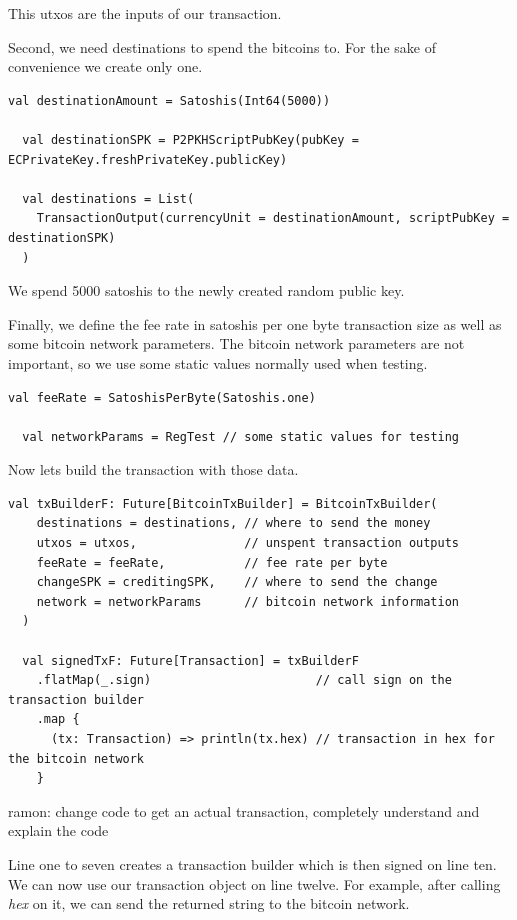 \documentclass[runningheads]{llncs}
\newcommand{\todo}[1]{{\par \color{red}#1}}
\begin{document}
This utxos are the inputs of our transaction.

Second, we need destinations to spend the bitcoins to.
For the sake of convenience we create only one.
\begin{lstlisting}[style=scala]
  val destinationAmount = Satoshis(Int64(5000))

  val destinationSPK = P2PKHScriptPubKey(pubKey = ECPrivateKey.freshPrivateKey.publicKey)

  val destinations = List(
    TransactionOutput(currencyUnit = destinationAmount, scriptPubKey = destinationSPK)
  )
\end{lstlisting}

We spend 5000 satoshis to the newly created random public key.

Finally, we define the fee rate in satoshis per one byte transaction
size as well as some bitcoin network parameters.  The bitcoin network
parameters are not important, so we use some static values normally
used when testing.

\begin{lstlisting}[style=scala]
  val feeRate = SatoshisPerByte(Satoshis.one)

  val networkParams = RegTest // some static values for testing
\end{lstlisting}

Now lets build the transaction with those data.
\begin{lstlisting}[style=scala]
  val txBuilderF: Future[BitcoinTxBuilder] = BitcoinTxBuilder(
    destinations = destinations, // where to send the money
    utxos = utxos,               // unspent transaction outputs
    feeRate = feeRate,           // fee rate per byte
    changeSPK = creditingSPK,    // where to send the change
    network = networkParams      // bitcoin network information
  )

  val signedTxF: Future[Transaction] = txBuilderF
    .flatMap(_.sign)                       // call sign on the transaction builder
    .map {
      (tx: Transaction) => println(tx.hex) // transaction in hex for the bitcoin network
    }
\end{lstlisting}

\todo{ramon: change code to get an actual transaction, completely understand and explain the code}

Line one to seven creates a transaction builder which is then signed
on line ten.  We can now use our transaction object on line twelve.
For example, after calling \emph{hex} on it, we can send the returned
string to the bitcoin network.
\end{document}
